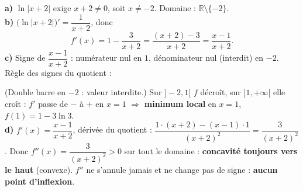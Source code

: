 \documentclass[11pt,a4paper]{article}
\newcommand{\R}{\mathbb{R}}
\begin{document}
\begin{corr}[3 --- $f(x)=x-3\ln|x+2|$]
\textbf{a)} $\ln|x+2|$ exige $x+2\neq 0$, soit $x\neq -2$. \quad Domaine : $\boxed{\R\setminus\{-2\}}$.\\[2mm]
\textbf{b)} $\big(\ln|x+2|\big)'=\dfrac{1}{x+2}$, donc
\[
f'(x)=1-\frac{3}{x+2}=\frac{(x+2)-3}{x+2}=\frac{x-1}{x+2}.
\]
\textbf{c)} Signe de $\dfrac{x-1}{x+2}$ : numérateur nul en $1$, dénominateur nul (interdit) en $-2$.
Règle des signes du quotient :
\begin{center}
\end{center}
(Double barre en $-2$ : valeur interdite.) Sur $]-2,1[$ $f$ décroît, sur $]1,+\infty[$ elle croît :
$f'$ passe de $-$ à $+$ en $x=1$ $\Rightarrow$ \textbf{minimum local} en $x=1$, $f(1)=1-3\ln 3$.\\[2mm]
\textbf{d)} $f'(x)=\dfrac{x-1}{x+2}$, dérivée du quotient : $\dfrac{1\cdot(x+2)-(x-1)\cdot1}{(x+2)^2}=\dfrac{3}{(x+2)^2}$.
Donc $f''(x)=\dfrac{3}{(x+2)^2}>0$ sur tout le domaine : \textbf{concavité toujours vers le haut}
(convexe). $f''$ ne s'annule jamais et ne change pas de signe : \textbf{aucun point d'inflexion}.
\end{corr}
\end{document}
